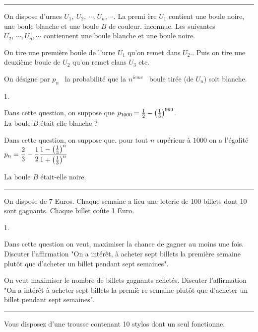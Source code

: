 \documentclass[11pt]{article}%
\begin{document}
\rule{15cm}{0.1cm}

On dispose d'urnes $U_{1},\ U_{2},\ \cdots ,U_{n},\cdots .$ La premi%
ère $U_{1}$ contient une boule noire, une boule blanche et une boule
$B$ de couleur. inconnue. Les suivantes $U_{2},\ \cdots ,U_{n},\cdots$
contiennent une boule blanche et une boule noire.

On tire une première boule de l'urne $U_{1}$ qu'on remet dans
$U_{2}$..  Puis on tire une deuxième boule de $U_{2}$ qu'on remet
clans $U_{3}$ etc.

On désigne par $p_{n}$ \ la probabilité que la $n^{i\grave{e}me}$ \
boule tirée (de $U_{n}$) soit blanche.

\begin{noliste}{1.}
\item Dans cette question, on suppose que $p_{1000}=\frac{1}{2}-\left( \frac{%
      1}{3}\right) ^{999}$. \\
  La boule $B$ était-elle blanche ?

\item Dans cette question, on suppose que. pour tout $n$ supérieur
  à $1000$ on a l'égalité $p_{n}=\dfrac{2}{3}-\dfrac{1}{2}\dfrac{%
    1-\left( \frac{1}{3}\right) ^{n}}{1+\left( \frac{1}{3}\right)
    ^{n}}$

  La boule $B$ était-elle noire.
\end{noliste}

\rule{15cm}{0.1cm}

On dispose de $7$ Euros. Chaque semaine a lieu une loterie de 100
billets dont 10 sont gagnants. Chaque billet co\^{u}te 1 Euro.

\begin{noliste}{1.}
\item Dans cette question on veut, maximiser la chance de gagner au moins
  une fois. Discuter l'affirmation "On a intérêt, à acheter sept
  billets la première semaine plut\^{o}t que d'acheter un billet pendant
  sept semaines".

\item On veut maximiser le nombre de billets gagnants achetés. Discuter
  l'affirmation "On a intérêt à acheter sept billets la premiè%
  re semaine plut\^{o}t que d'acheter un billet pendant sept semaines".
\end{noliste}

\rule{15cm}{0.1cm}

Vous disposez d'une trousse contenant 10 stylos dont un seul
fonctionne.
\end{document}

